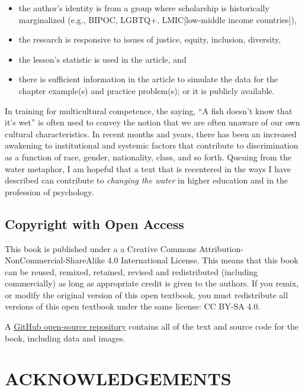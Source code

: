 \documentclass[
  11pt,
]{book}
\providecommand{\tightlist}{%
  \setlength{\itemsep}{0pt}\setlength{\parskip}{0pt}}
\begin{document}
\begin{itemize}
\tightlist
\item
  the author's identity is from a group where scholarship is historically marginalized (e.g., BIPOC, LGBTQ+, LMIC{[}low-middle income countries{]}),
\item
  the research is responsive to issues of justice, equity, inclusion, diversity,
\item
  the lesson's statistic is used in the article, and
\item
  there is sufficient information in the article to simulate the data for the chapter example(s) and practice problem(s); or it is publicly available.
\end{itemize}

In training for multicultural competence, the saying, ``A fish doesn't know that it's wet'' is often used to convey the notion that we are often unaware of our own cultural characteristics. In recent months and years, there has been an increased awakening to institutional and systemic factors that contribute to discrimination as a function of race, gender, nationality, class, and so forth. Queuing from the water metaphor, I am hopeful that a text that is recentered in the ways I have described can contribute to \emph{changing the water} in higher education and in the profession of psychology.

\hypertarget{copyright-with-open-access}{%
\section*{Copyright with Open Access}\label{copyright-with-open-access}}

This book is published under a a Creative Commons Attribution-NonCommercial-ShareAlike 4.0 International License. This means that this book can be reused, remixed, retained, revised and redistributed (including commercially) as long as appropriate credit is given to the authors. If you remix, or modify the original version of this open textbook, you must redistribute all versions of this open textbook under the same license: CC BY-SA 4.0.

A \href{https://github.com/lhbikos/ReCenterPsychStats}{GitHub open-source repository} contains all of the text and source code for the book, including data and images.

\hypertarget{acknowledgements}{%
\chapter*{ACKNOWLEDGEMENTS}\label{acknowledgements}}
\end{document}
